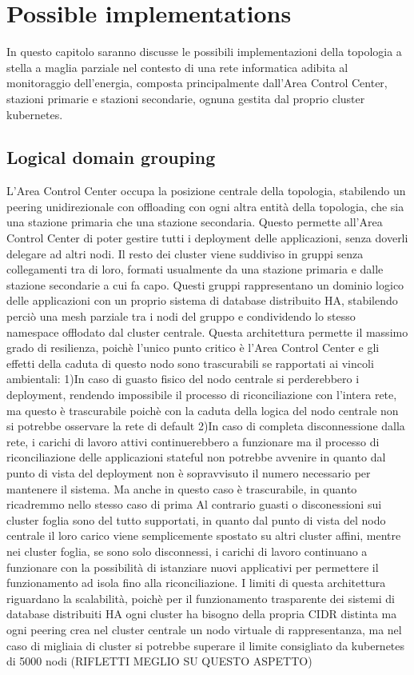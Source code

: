 \chapter{Possible implementations}
In questo capitolo saranno discusse le possibili implementazioni della topologia a stella a maglia parziale nel contesto di una rete informatica adibita al monitoraggio dell'energia, composta principalmente dall'Area Control Center, stazioni primarie e stazioni secondarie, ognuna gestita dal proprio cluster kubernetes.

\section{Logical domain grouping}
L'Area Control Center occupa la posizione centrale della topologia,  stabilendo un peering unidirezionale con offloading con ogni altra entità della topologia, che sia una stazione primaria che una stazione secondaria. Questo permette all'Area Control Center di poter gestire tutti i deployment delle applicazioni, senza doverli delegare ad altri nodi.
Il resto dei cluster viene suddiviso in gruppi senza collegamenti tra di loro, formati usualmente da una stazione primaria e dalle stazione secondarie a cui fa capo. Questi gruppi rappresentano un dominio logico delle applicazioni con un proprio sistema di database distribuito HA, stabilendo perciò una mesh parziale tra i nodi del gruppo e condividendo lo stesso namespace offlodato dal cluster centrale. 
Questa architettura permette il massimo grado di resilienza, poichè l'unico punto critico è l'Area Control Center e gli effetti della caduta di questo nodo sono trascurabili se rapportati ai vincoli ambientali:  
1)In caso di guasto fisico del nodo centrale si perderebbero i deployment, rendendo impossibile il processo di riconciliazione con l'intera rete, ma questo è trascurabile poichè con la caduta della logica del nodo centrale non si potrebbe osservare la rete di default
2)In caso di completa disconnessione dalla rete, i carichi di lavoro attivi continuerebbero a funzionare ma il processo di riconciliazione delle applicazioni stateful non potrebbe avvenire in quanto dal punto di vista del deployment non è sopravvisuto il numero necessario per mantenere il sistema. Ma anche in questo caso è trascurabile, in quanto ricadremmo nello stesso caso di prima
Al contrario guasti o disconessioni sui cluster foglia sono del tutto supportati, in quanto dal punto di vista del nodo centrale il loro carico viene semplicemente spostato su altri cluster affini, mentre nei cluster foglia, se sono solo disconnessi, i carichi di lavoro continuano a funzionare con la possibilità di istanziare nuovi applicativi per permettere il funzionamento ad isola fino alla riconciliazione.
I limiti di questa architettura riguardano la scalabilità, poichè per il funzionamento trasparente dei sistemi di database distribuiti HA ogni cluster ha bisogno della propria CIDR distinta ma ogni peering crea nel cluster centrale un nodo virtuale di rappresentanza, ma nel caso di migliaia di cluster si potrebbe superare il limite consigliato da kubernetes di 5000 nodi (RIFLETTI MEGLIO SU QUESTO ASPETTO)

